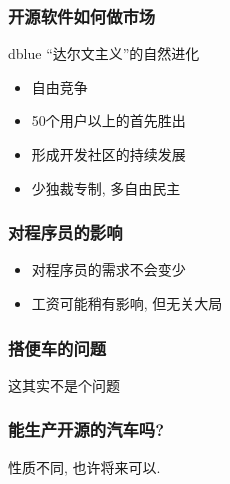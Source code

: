 \documentclass{beamer}
\newenvironment{pblock}{\begin{beamercolorbox}[rounded=true,
              shadow=true]{dblue}}{\end{beamercolorbox}}
\begin{document}
\begin{frame}
	\frametitle{开源软件如何做市场}
    \begin{pblock}
        ``达尔文主义''的自然进化\\
    \end{pblock}
	\begin{itemize}
		\item 自由竞争
		\item 50个用户以上的首先胜出
		\item 形成开发社区的持续发展
		\item 少独裁专制, 多自由民主
	\end{itemize}
\end{frame}

\begin{frame}
	\frametitle{对程序员的影响}
	\begin{itemize}
		\item 对程序员的需求不会变少
		\item 工资可能稍有影响, 但无关大局
	\end{itemize}
\end{frame}

\begin{frame}
	\frametitle{搭便车的问题}
	这其实不是个问题
\end{frame}

\begin{frame}
	\frametitle{能生产开源的汽车吗?}
	性质不同, 也许将来可以.
\end{frame}
\end{document}
